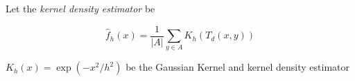 Let the \textit{ kernel density estimator} be

\[   \hat{f}_h(x) = \frac{1}{|A|}\sum_{ y \in A} K_h (T_d(x,y))  \]

 $K_h(x) = \exp( -x^2/h^2)$ be the Gaussian Kernel and
 kernel density estimator

